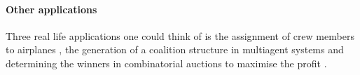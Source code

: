 \paragraph{Other applications} Three real life applications one could think of is the assignment of crew members to airplanes \cite{Airplanes}, the generation of a coalition structure in multiagent systems \cite{Coalition} and determining the winners in combinatorial auctions to maximise the profit \cite{Auction1,Auction2,Auction3}.





